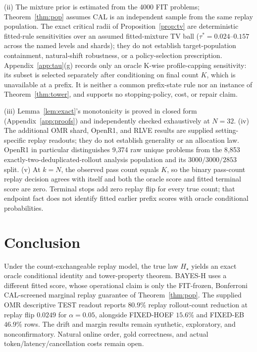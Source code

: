\documentclass{article}
\theoremstyle{definition}
\theoremstyle{remark}
\newcommand{\trueH}{H_\star}
\begin{document}
(ii) The mixture prior is estimated from the 4000 FIT problems; Theorem~\ref{thm:pop}
assumes CAL is an independent sample from the same replay population. The exact
critical radii of Proposition~\ref{prop:tv} are
deterministic fitted-rule sensitivities over an assumed fitted-mixture TV ball
($\tau^*=0.024$--$0.157$ across the named levels and shards); they do not
establish target-population containment, natural-shift robustness, or a
policy-selection prescription. Appendix~\ref{app:tau}(g) records only an
oracle K-wise profile-capping sensitivity: its subset is selected separately
after conditioning on final count $K$, which is unavailable at a prefix. It
is neither a common prefix-state rule nor an instance of
Theorem~\ref{thm:tower}, and supports no stopping-policy, cost, or repair
claim.

(iii) Lemma~\ref{lem:exact}'s monotonicity is proved in closed form
(Appendix~\ref{app:proofs}) and independently checked exhaustively at
$N=32$. (iv) The additional OMR shard, OpenR1, and RLVE results are supplied
setting-specific replay readouts; they do not establish generality or an
allocation law. OpenR1 in particular distinguishes 9{,}374 raw unique
problems from the 8{,}853 exactly-two-deduplicated-rollout analysis population
and its $3000/3000/2853$ split. (v) At $k=N$, the observed pass count equals
$K$, so the binary pass-count replay decision agrees with itself and both the
oracle score and fitted terminal score are zero. Terminal stops add zero replay
flip for every true count; that endpoint fact does not identify fitted earlier
prefix scores with oracle conditional probabilities.

\section{Conclusion}
Under the count-exchangeable replay model, the true law $\trueH$ yields an
exact oracle conditional identity and tower-property theorem. BAYES-H uses a
different fitted score, whose operational claim is only the FIT-frozen,
Bonferroni CAL-screened marginal replay guarantee of
Theorem~\ref{thm:pop}. The supplied OMR descriptive TEST readout reports
$80.9\%$ replay rollout-count reduction at replay flip $0.0249$ for
$\alpha=0.05$, alongside FIXED-HOEF $15.6\%$ and FIXED-EB $46.9\%$ rows.
The drift and margin results remain synthetic, exploratory, and
nonconfirmatory. Natural online order, gold correctness, and actual
token/latency/cancellation costs remain open.
\end{document}
